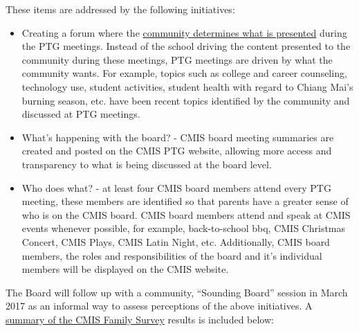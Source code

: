 These items are addressed by the following initiatives:
\begin{itemize}
\item Creating a forum where the \href{https://docs.google.com/document/d/1kiwakkg8eKdtEexCxVNx-m1CfC3VqxhukDy8WXDPGKY/edit?ts=58a2a142}{community determines what is presented} during the PTG meetings. Instead of the school driving the content presented to the community during these meetings, PTG meetings are driven by what the community wants. For example, topics such as college and career counseling, technology use, student activities, student health with regard to Chiang Mai’s burning season, etc. have been recent topics identified by the community and discussed at PTG meetings.
\item What’s happening with the board? - CMIS board meeting summaries are created and posted on the CMIS PTG website, allowing more access and transparency to what is being discussed at the board level.
\item Who does what? - at least four CMIS board members attend every PTG meeting, these members are identified so that parents have a greater sense of who is on the CMIS board. CMIS board members attend and speak at CMIS events whenever possible, for example, back-to-school bbq, CMIS Christmas Concert, CMIS Plays, CMIS Latin Night, etc. Additionally, CMIS board members, the roles and responsibilities of the board and it’s individual members will be displayed on the CMIS website.
\end{itemize}

The Board will follow up with a community, “Sounding Board” session in March 2017 as an informal way to assess perceptions of the above initiatives.  A \href{https://docs.google.com/a/cmis.ac.th/document/d/1_otvw47y3Z-1CSjXnKhgRTauVRqPl1S6nSdmsb00O2k/edit?usp=sharing}{summary of the CMIS Family Survey} results is included below:  


